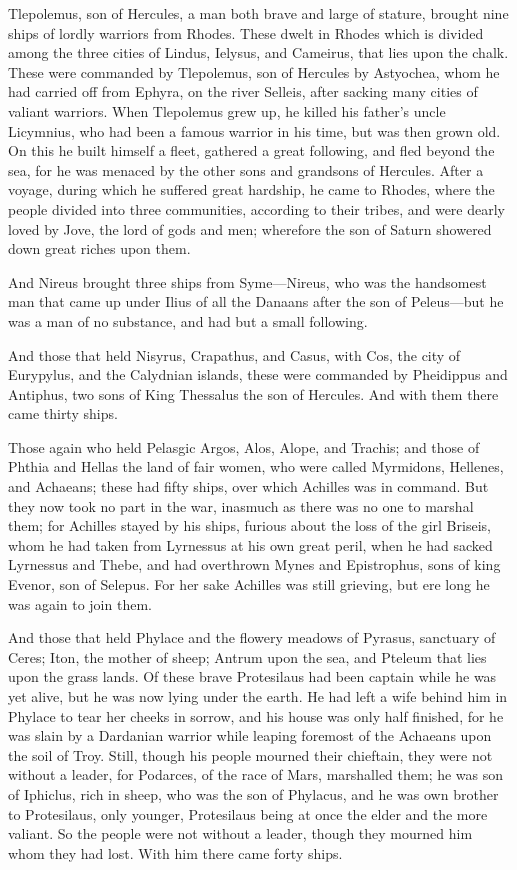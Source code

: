 Tlepolemus, son of Hercules, a man both brave and large of stature,
brought nine ships of lordly warriors from Rhodes. These dwelt in Rhodes
which is divided among the three cities of Lindus, Ielysus, and Cameirus,
that lies upon the chalk. These were commanded by Tlepolemus, son of
Hercules by Astyochea, whom he had carried off from Ephyra, on the river
Selleis, after sacking many cities of valiant warriors. When Tlepolemus
grew up, he killed his father’s uncle Licymnius, who had been a famous
warrior in his time, but was then grown old. On this he built himself a
fleet, gathered a great following, and fled beyond the sea, for he was
menaced by the other sons and grandsons of Hercules. After a voyage,
during which he suffered great hardship, he came to Rhodes, where the
people divided into three communities, according to their tribes, and were
dearly loved by Jove, the lord of gods and men; wherefore the son of
Saturn showered down great riches upon them.

And Nireus brought three ships from Syme—Nireus, who was the
handsomest man that came up under Ilius of all the Danaans after the son
of Peleus—but he was a man of no substance, and had but a small
following.

And those that held Nisyrus, Crapathus, and Casus, with Cos, the city of
Eurypylus, and the Calydnian islands, these were commanded by Pheidippus
and Antiphus, two sons of King Thessalus the son of Hercules. And with
them there came thirty ships.

Those again who held Pelasgic Argos, Alos, Alope, and Trachis; and those
of Phthia and Hellas the land of fair women, who were called Myrmidons,
Hellenes, and Achaeans; these had fifty ships, over which Achilles was in
command. But they now took no part in the war, inasmuch as there was no
one to marshal them; for Achilles stayed by his ships, furious about the
loss of the girl Briseis, whom he had taken from Lyrnessus at his own
great peril, when he had sacked Lyrnessus and Thebe, and had overthrown
Mynes and Epistrophus, sons of king Evenor, son of Selepus. For her sake
Achilles was still grieving, but ere long he was again to join them.

And those that held Phylace and the flowery meadows of Pyrasus, sanctuary
of Ceres; Iton, the mother of sheep; Antrum upon the sea, and Pteleum that
lies upon the grass lands. Of these brave Protesilaus had been captain
while he was yet alive, but he was now lying under the earth. He had left
a wife behind him in Phylace to tear her cheeks in sorrow, and his house
was only half finished, for he was slain by a Dardanian warrior while
leaping foremost of the Achaeans upon the soil of Troy. Still, though his
people mourned their chieftain, they were not without a leader, for
Podarces, of the race of Mars, marshalled them; he was son of Iphiclus,
rich in sheep, who was the son of Phylacus, and he was own brother to
Protesilaus, only younger, Protesilaus being at once the elder and the
more valiant. So the people were not without a leader, though they mourned
him whom they had lost. With him there came forty ships.

